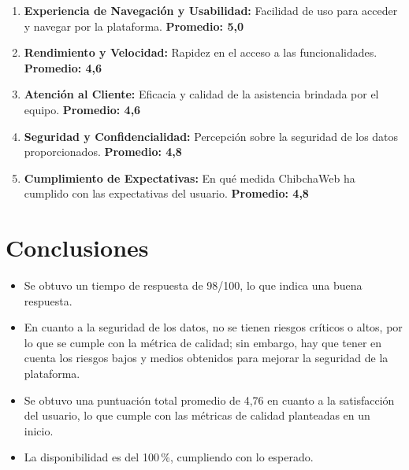 \documentclass[12pt,a4paper]{article}
\begin{document}
\begin{enumerate}
  \item \textbf{Experiencia de Navegación y Usabilidad:} Facilidad de uso para acceder y navegar
        por la plataforma. \textbf{Promedio: 5,0}
  \item \textbf{Rendimiento y Velocidad:} Rapidez en el acceso a las funcionalidades. \textbf{Promedio: 4,6}
  \item \textbf{Atención al Cliente:} Eficacia y calidad de la asistencia brindada por el equipo.
        \textbf{Promedio: 4,6}
  \item \textbf{Seguridad y Confidencialidad:} Percepción sobre la seguridad de los datos
        proporcionados. \textbf{Promedio: 4,8}
  \item \textbf{Cumplimiento de Expectativas:} En qué medida ChibchaWeb ha cumplido con las
        expectativas del usuario. \textbf{Promedio: 4,8}
\end{enumerate}

\section{Conclusiones}

\begin{itemize}
  \item Se obtuvo un tiempo de respuesta de 98/100, lo que indica una buena respuesta.
  \item En cuanto a la seguridad de los datos, no se tienen riesgos críticos o altos, por lo que se
        cumple con la métrica de calidad; sin embargo, hay que tener en cuenta los riesgos bajos y
        medios obtenidos para mejorar la seguridad de la plataforma.
  \item Se obtuvo una puntuación total promedio de 4,76 en cuanto a la satisfacción del usuario, lo
        que cumple con las métricas de calidad planteadas en un inicio.
  \item La disponibilidad es del 100\,\%, cumpliendo con lo esperado.
\end{itemize}
\end{document}
